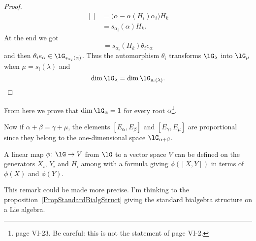\begin{proof}
\begin{equation}
\begin{aligned}[]
            &=\big( \alpha-\alpha(H_i)\alpha_i \big)H_k\\
            &=s_{\alpha_i}(\alpha)H_k.
        \end{aligned}
    \end{equation}
    At the end we got
    \begin{equation}
        [H_k,\theta_ie_{\alpha}]=s_{\alpha_i}(H_k)\theta_ie_{\alpha}
    \end{equation}
    and then \( \theta_ie_{\alpha}\in\lG_{s_{\alpha_i}(\alpha)}\). Thus the automorphism \( \theta_i\) transforms \( \lG_{\lambda}\) into \( \lG_{\mu}\) when \( \mu=s_i(\lambda)\) and
    \begin{equation}
        \dim\lG_{\lambda}=\dim\lG_{s_i(\lambda)}.
    \end{equation}
\end{proof}
From here we prove that \( \dim\lG_{\alpha}=1\) for every root \( \alpha\)\footnote{\cite{SerreSSAlgebres} page VI-23. Be careful: this is not the statement of page VI-2.}.

Now if \( \alpha+\beta=\gamma+\mu\), the elements \( [E_{\alpha},E_{\beta}]\) and \( [E_{\gamma},E_{\mu}]\) are proportional since they belong to the one-dimensional space \( \lG_{\alpha+\beta}\).


\begin{remark}      \label{RemChevDefmapCommXH}
    A linear map \( \phi\colon \lG\to V\) from \( \lG\) to a vector space \( V\) can be defined on the generators \( X_i\), \( Y_i\) and \( H_i\) among with a formula giving \( \phi([X,Y])\) in terms of \( \phi(X)\) and \( \phi(Y)\).
\end{remark}

\begin{probleme}
    This remark could be made more precise. I'm thinking to the proposition~\ref{PropStandardBialgStruct} giving the standard bialgebra structure on a Lie algebra.
\end{probleme}

